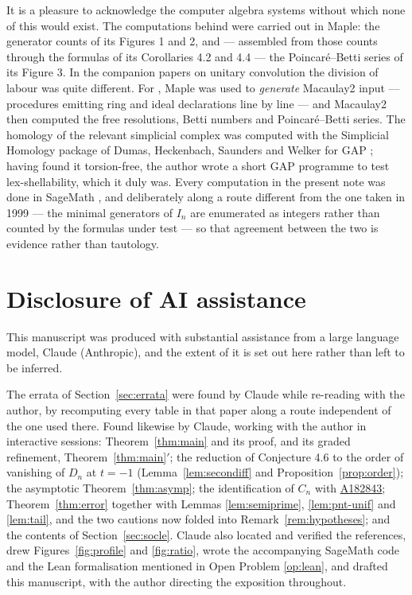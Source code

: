 \documentclass[a4paper,11pt,oneside,reqno]{amsart}
\theoremstyle{definition}
\theoremstyle{remark}
\theoremstyle{plain}
\newcommand{\seqnum}[1]{\href{https://oeis.org/#1}{\underline{#1}}}
\begin{document}
It is a pleasure to acknowledge the computer algebra systems without which
none of this would exist. The computations behind \cite{Snellman2000} were
carried out in \textsf{Maple}: the generator counts of its Figures 1 and 2,
and --- assembled from those counts through the formulas of its Corollaries 4.2
and 4.4 --- the Poincaré--Betti series of its Figure 3. In the companion papers
on unitary convolution the division of labour was quite different. For
\cite{SnellmanUnitaryGeneral,SnellmanUnitaryN}, \textsf{Maple} was used to \emph{generate}
\textsf{Macaulay2} \cite{Macaulay2} input --- procedures emitting ring and
ideal declarations line by line --- and \textsf{Macaulay2} then computed the
free resolutions, Betti numbers and Poincaré--Betti series. The homology of the
relevant simplicial complex was computed with the \textsf{Simplicial Homology}
package \cite{SimplicialHomology} of Dumas, Heckenbach, Saunders and Welker for
\textsf{GAP} \cite{GAP}; having found it torsion-free, the author wrote a short
\textsf{GAP} programme to test lex-shellability, which it duly was. Every
computation in the present note was done in \textsf{SageMath} \cite{Sage}, and
deliberately along a route different from the one taken
in 1999 --- the minimal generators of \(I_n\) are enumerated as integers rather
than counted by the formulas under test --- so that agreement between the two is
evidence rather than tautology.

\section*{Disclosure of AI assistance}

This manuscript was produced with substantial assistance from a large language
model, Claude (Anthropic), and the extent of it is set out here rather than
left to be inferred.

The errata of Section~\ref{sec:errata} were found by Claude while re-reading
\cite{Snellman2000} with the author, by recomputing every table in that paper
along a route independent of the one used there. Found likewise by Claude,
working with the author in interactive sessions: Theorem~\ref{thm:main} and its
proof, and its graded refinement, Theorem~\ref{thm:main}\({}'\); the reduction of Conjecture 4.6 to the order of vanishing of \(D_n\) at
\(t = -1\) (Lemma~\ref{lem:secondiff} and Proposition~\ref{prop:order}); the
asymptotic Theorem~\ref{thm:asymp}; the identification of \(C_n\) with
\seqnum{A182843}; Theorem~\ref{thm:error} together with Lemmas
\ref{lem:semiprime}, \ref{lem:pnt-unif} and \ref{lem:tail}, and the two
cautions now folded into Remark~\ref{rem:hypotheses}; and
the contents of Section~\ref{sec:socle}. Claude also located and verified the
references, drew Figures~\ref{fig:profile} and \ref{fig:ratio}, wrote the accompanying
\textsf{SageMath} code and the Lean formalisation mentioned in Open Problem
\ref{op:lean}, and drafted this manuscript, with the author directing the
exposition throughout.
\end{document}
